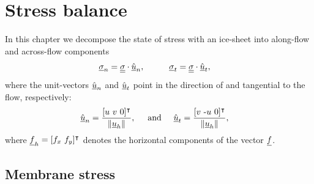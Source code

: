 
\chapter{Stress balance} \label{ssn_stress_balance}

In this chapter we decompose the state of stress with an ice-sheet into along-flow and across-flow components
\begin{align*}
  \rankone{\sigma}_n &= \ranktwo{\sigma} \cdot \hat{\rankone{u}}_n, \hspace{10mm}
  \rankone{\sigma}_t  = \ranktwo{\sigma} \cdot \hat{\rankone{u}}_t,
\end{align*}
where the unit-vectors $\hat{\underline{u}}_n$ and $\hat{\underline{u}}_t$ point in the direction of and tangential to the flow, respectively:
\begin{align}
  \label{flow_coordinate_system}
  \hat{\underline{u}}_n &= \frac{[u\ v\ 0]^\intercal}{\Vert \underline{u}_h \Vert}, \hspace{5mm} \text{and} \hspace{5mm}
  \hat{\underline{u}}_t  = \frac{[v\ \text{-}u\ 0]^\intercal}{\Vert \underline{u}_h \Vert},
\end{align}
where $\underline{f}_h = [f_x\ f_y]^\intercal$ denotes the horizontal components of the vector $\underline{f}$.

\section{Membrane stress} \label{ssn_membrane_stress}

